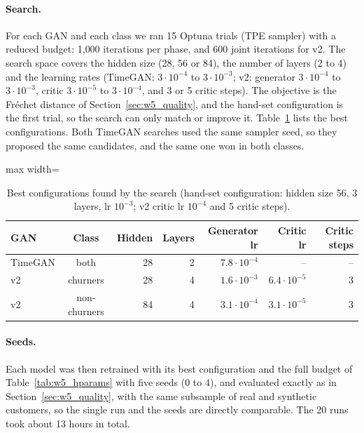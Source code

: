 \documentclass{article}
\begin{document}
\paragraph{Search.} For each GAN and each class we ran 15 Optuna trials (TPE sampler) with a reduced budget: 1{,}000 iterations per phase, and 600 joint iterations for v2. The search space covers the hidden size (28, 56 or 84), the number of layers (2 to 4) and the learning rates (TimeGAN: $3\cdot10^{-4}$ to $3\cdot10^{-3}$; v2: generator $3\cdot10^{-4}$ to $3\cdot10^{-3}$, critic $3\cdot10^{-5}$ to $3\cdot10^{-4}$, and 3 or 5 critic steps). The objective is the Fréchet distance of Section~\ref{sec:w5_quality}, and the hand-set configuration is the first trial, so the search can only match or improve it. Table~\ref{tab:w5_optuna} lists the best configurations. Both TimeGAN searches used the same sampler seed, so they proposed the same candidates, and the same one won in both classes.

\begin{table}[H]
\centering
\renewcommand{\arraystretch}{1.3}
\begin{adjustbox}{max width=\textwidth}
\begin{tabular}{|l|c|r|r|r|r|r|}
\hline
\textbf{GAN} & \textbf{Class} & \textbf{Hidden} & \textbf{Layers} & \textbf{Generator lr} & \textbf{Critic lr} & \textbf{Critic steps} \\ \hline
TimeGAN & both & 28 & 2 & $7.8\cdot10^{-4}$ & -- & -- \\ \hline
v2 & churners & 28 & 4 & $1.6\cdot10^{-3}$ & $6.4\cdot10^{-5}$ & 3 \\ \hline
v2 & non-churners & 84 & 4 & $3.1\cdot10^{-4}$ & $3.1\cdot10^{-5}$ & 3 \\ \hline
\end{tabular}
\end{adjustbox}
\caption{Best configurations found by the search (hand-set configuration: hidden size 56, 3 layers, lr $10^{-3}$; v2 critic lr $10^{-4}$ and 5 critic steps).}
\label{tab:w5_optuna}
\end{table}

\paragraph{Seeds.} Each model was then retrained with its best configuration and the full budget of Table~\ref{tab:w5_hparams} with five seeds (0 to 4), and evaluated exactly as in Section~\ref{sec:w5_quality}, with the same subsample of real and synthetic customers, so the single run and the seeds are directly comparable. The 20 runs took about 13 hours in total.
\end{document}

